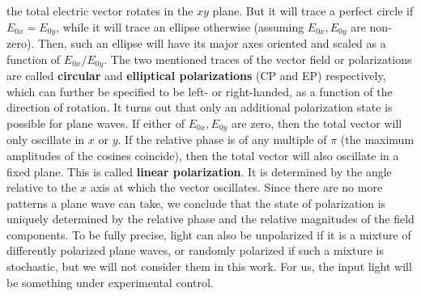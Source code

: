 \documentclass[11pt, a4paper, twoside]{article} %
\DeclareRobustCommand{\mybox}[2][gray!10]{%
\begin{tcolorbox}[   %
        left=0.2cm,
        right=0.2cm,
        top=0.15cm,
        bottom=0.15cm,
        colback=#1,
        colframe=#1,
        width=\dimexpr\textwidth\relax, 
        enlarge left by=0mm,
        boxsep=5pt,
        arc=0pt,outer arc=0pt,
        ]
        #2
\end{tcolorbox}
}
\begin{document}
\mybox{ the total electric vector rotates in the $xy$ plane. But it will trace a perfect circle if $E_{0x}=E_{0y}$, while it will trace an ellipse otherwise (assuming $E_{0x},E_{0y}$ are non-zero). Then, such an ellipse will have its major axes oriented and scaled as a function of $E_{0x}/E_{0y}$. The two mentioned traces of the vector field or polarizations are called {\bf circular} and {\bf elliptical polarizations} (CP and EP) respectively, which can further be specified to be left- or right-handed, as a function of the direction of rotation. It turns out that only an additional polarization state is possible for plane waves. If either of $E_{0x},E_{0y}$ are zero, then the total vector will only oscillate in $x$ or $y$. If the relative phase is of any multiple of $\pi$ (the maximum amplitudes of the cosines coincide), then the total vector will also oscillate in a fixed plane. This is called {\bf linear polarization}. It is determined by the angle relative to the $x$ axis at which the vector oscillates. Since there are no more patterns a plane wave can take, we conclude that the state of polarization is uniquely determined by the relative phase and the relative magnitudes of the field components. To be fully precise, light can also be unpolarized if it is a mixture of differently polarized plane waves, or randomly polarized if such a mixture is stochastic, but we will not consider them in this work. For us, the input light will be something under experimental control.\vspace{-0.1cm}\\

}
\end{document}
